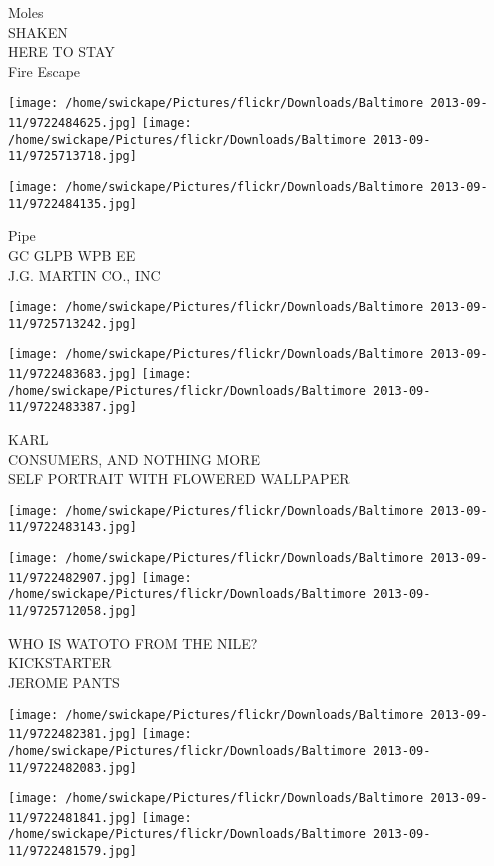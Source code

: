 \documentclass[10pt,letterpaper]{article}
\begin{document}
Moles\\
SHAKEN\\
HERE TO STAY\\
Fire Escape
\pagebreak

\texttt{[image: /home/swickape/Pictures/flickr/Downloads/Baltimore 2013-09-11/9722484625.jpg]}
\texttt{[image: /home/swickape/Pictures/flickr/Downloads/Baltimore 2013-09-11/9725713718.jpg]}

\vspace{0.25in}
\texttt{[image: /home/swickape/Pictures/flickr/Downloads/Baltimore 2013-09-11/9722484135.jpg]}

Pipe\\
GC GLPB WPB EE\\
J.G. MARTIN CO., INC
\pagebreak

\texttt{[image: /home/swickape/Pictures/flickr/Downloads/Baltimore 2013-09-11/9725713242.jpg]}

\vspace{0.25in}
\texttt{[image: /home/swickape/Pictures/flickr/Downloads/Baltimore 2013-09-11/9722483683.jpg]}
\texttt{[image: /home/swickape/Pictures/flickr/Downloads/Baltimore 2013-09-11/9722483387.jpg]}

KARL\\
CONSUMERS, AND NOTHING MORE\\
SELF PORTRAIT WITH FLOWERED WALLPAPER
\pagebreak

\texttt{[image: /home/swickape/Pictures/flickr/Downloads/Baltimore 2013-09-11/9722483143.jpg]}

\vspace{0.25in}
\texttt{[image: /home/swickape/Pictures/flickr/Downloads/Baltimore 2013-09-11/9722482907.jpg]}
\texttt{[image: /home/swickape/Pictures/flickr/Downloads/Baltimore 2013-09-11/9725712058.jpg]}

WHO IS WATOTO FROM THE NILE?\\
KICKSTARTER\\
JEROME PANTS
\pagebreak

\texttt{[image: /home/swickape/Pictures/flickr/Downloads/Baltimore 2013-09-11/9722482381.jpg]}
\texttt{[image: /home/swickape/Pictures/flickr/Downloads/Baltimore 2013-09-11/9722482083.jpg]}

\texttt{[image: /home/swickape/Pictures/flickr/Downloads/Baltimore 2013-09-11/9722481841.jpg]}
\texttt{[image: /home/swickape/Pictures/flickr/Downloads/Baltimore 2013-09-11/9722481579.jpg]}
\end{document}
